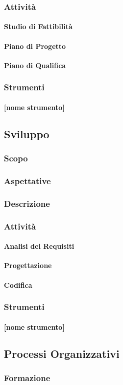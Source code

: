 \subsubsection{Attività}
\paragraph{Studio di Fattibilità}
\paragraph{Piano di Progetto}
\paragraph{Piano di Qualifica}
\subsubsection{Strumenti}
\paragraph{[nome strumento]}

\subsection{Sviluppo}
\subsubsection{Scopo}
\subsubsection{Aspettative}
\subsubsection{Descrizione}
\subsubsection{Attività}
\paragraph{Analisi dei Requisiti}
\paragraph{Progettazione}
\paragraph{Codifica}
\subsubsection{Strumenti}
\paragraph{[nome strumento]}

\subsection{Processi Organizzativi}
\subsubsection{Formazione}


